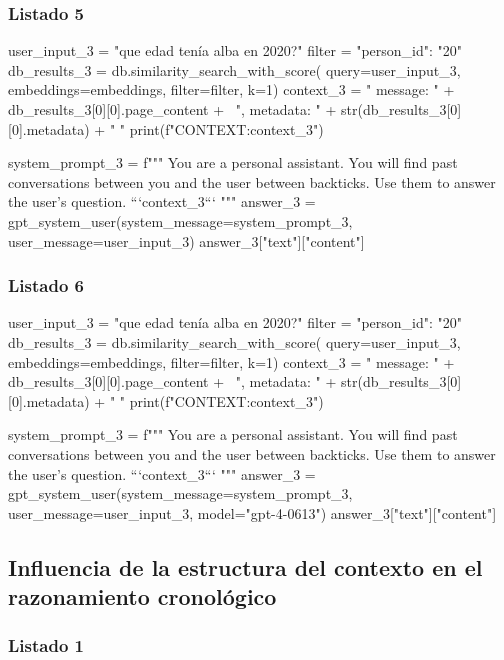 \subsubsection{Listado 5}
\label{anexo:code-4-1-8-5}

\begin{APACode}
user_input_3 = "que edad tenía alba en 2020?"
filter = {"person_id": "20"}
db_results_3 = db.similarity_search_with_score(
    query=user_input_3, embeddings=embeddings, filter=filter, k=1)
context_3 = "{ message: " + db_results_3[0][0].page_content + \
            ", metadata: " + str(db_results_3[0][0].metadata) + " }"
print(f"CONTEXT:{context_3}")

system_prompt_3 = f"""
You are a personal assistant. You will find past conversations between you 
and the user between backticks. Use them to answer the user's question.
```{context_3}```
"""
answer_3 = gpt_system_user(system_message=system_prompt_3, 
                          user_message=user_input_3)
answer_3["text"]["content"]
\end{APACode}

\subsubsection{Listado 6}
\label{anexo:code-4-1-8-6}

\begin{APACode}
user_input_3 = "que edad tenía alba en 2020?"
filter = {"person_id": "20"}
db_results_3 = db.similarity_search_with_score(
    query=user_input_3, embeddings=embeddings, filter=filter, k=1)
context_3 = "{ message: " + db_results_3[0][0].page_content + \
            ", metadata: " + str(db_results_3[0][0].metadata) + " }"
print(f"CONTEXT:{context_3}")

system_prompt_3 = f"""
You are a personal assistant. You will find past conversations between you 
and the user between backticks. Use them to answer the user's question.
```{context_3}```
"""
answer_3 = gpt_system_user(system_message=system_prompt_3, 
                          user_message=user_input_3, model="gpt-4-0613")
answer_3["text"]["content"]
\end{APACode}

\subsection{Influencia de la estructura del contexto en el razonamiento cronológico}

\subsubsection{Listado 1}
\label{anexo:code-4-1-9-1}


